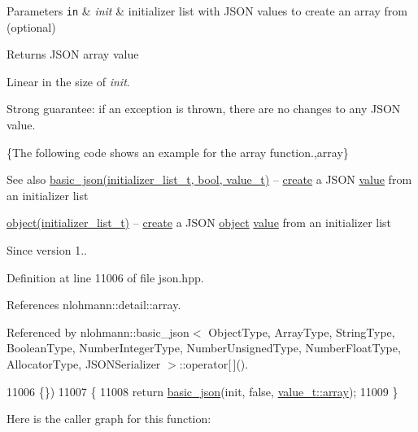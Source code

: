 \begin{DoxyParams}[1]{Parameters}
\mbox{\tt in}  & {\em init} & initializer list with J\+S\+ON values to create an array from (optional)\\
\hline
\end{DoxyParams}
\begin{DoxyReturn}{Returns}
J\+S\+ON array value
\end{DoxyReturn}
Linear in the size of {\itshape init}.

Strong guarantee\+: if an exception is thrown, there are no changes to any J\+S\+ON value.

\{The following code shows an example for the {\ttfamily array} function.,array\}

\begin{DoxySeeAlso}{See also}
\hyperlink{classnlohmann_1_1basic__json_ab5dfd9a2b2663b219641cb7fe59b6da2}{basic\+\_\+json(initializer\+\_\+list\+\_\+t, bool, value\+\_\+t)} -- \hyperlink{classnlohmann_1_1basic__json_a81100399cf3e2be457937be7db3f5729}{create} a J\+S\+ON \hyperlink{classnlohmann_1_1basic__json_adcf8ca5079f5db993820bf50036bf45d}{value} from an initializer list 

\hyperlink{classnlohmann_1_1basic__json_aa13f7c0615867542ce80337cbcf13ada}{object(initializer\+\_\+list\+\_\+t)} -- \hyperlink{classnlohmann_1_1basic__json_a81100399cf3e2be457937be7db3f5729}{create} a J\+S\+ON \hyperlink{classnlohmann_1_1basic__json_aa13f7c0615867542ce80337cbcf13ada}{object} \hyperlink{classnlohmann_1_1basic__json_adcf8ca5079f5db993820bf50036bf45d}{value} from an initializer list
\end{DoxySeeAlso}
\begin{DoxySince}{Since}
version 1.. 
\end{DoxySince}


Definition at line 11006 of file json.\+hpp.



References nlohmann\+::detail\+::array.



Referenced by nlohmann\+::basic\+\_\+json$<$ Object\+Type, Array\+Type, String\+Type, Boolean\+Type, Number\+Integer\+Type, Number\+Unsigned\+Type, Number\+Float\+Type, Allocator\+Type, J\+S\+O\+N\+Serializer $>$\+::operator\mbox{[}$\,$\mbox{]}().


\begin{DoxyCode}
11006                                                       \{\})
11007     \{
11008         \textcolor{keywordflow}{return} \hyperlink{classnlohmann_1_1basic__json_aed115142bd0c6c66c864700e0467df55}{basic\_json}(init, \textcolor{keyword}{false}, \hyperlink{namespacenlohmann_1_1detail_a1ed8fc6239da25abcaf681d30ace4985af1f713c9e000f5d3f280adbd124df4f5}{value\_t::array});
11009     \}
\end{DoxyCode}
Here is the caller graph for this function\+:
\mbox{\label{classnlohmann_1_1basic__json_a4a82d3fb7a111641decf35c2fb707c7f}} 
